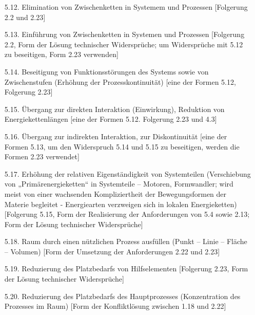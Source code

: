 \documentclass[11pt,a4paper]{article}
\begin{document}
\begin{itemize}
  \begin{itemize}
  \item zur Überwindung natürlicher Grenzen 
  \item zur Beseitigung ökologischer schädlicher Effekte
  \item zur Steigerung der Effizienz des Systems bei der Nutzung von Abfällen
    (insbesondere wenn die natürlichen Ressourcen erschöpft sind)
  \end{itemize}
[eine der Folgerungen 5.8 und 2.21, Folgerung 2.23. Form der Konfliktlösung
  zwischen 1.18 und 2.22, Form der Lösung technischer Widersprüche]
\item[5.12.] Elimination von Zwischenketten in Systemem und Prozessen
  [Folgerung 2.2 und 2.23]
\item[5.13.] Einführung von Zwischenketten in Systemen und Prozessen
  [Folgerung 2.2, Form der Lösung technischer Widersprüche; um Widersprüche
    mit 5.12 zu beseitigen, Form 2.23 verwenden]
\item[5.14.] Beseitigung von Funktionsstörungen des Systems sowie von
  Zwischenstufen (Erhöhung der Prozesskontinuität) [eine der Formen 5.12,
    Folgerung 2.23]
\item[5.15.] Übergang zur direkten Interaktion (Einwirkung), Reduktion von
  Energiekettenlängen [eine der Formen 5.12. Folgerung 2.23 und 4.3]
\item[5.16.] Übergang zur indirekten Interaktion, zur Diskontinuität [eine der
  Formen 5.13, um den Widerspruch 5.14 und 5.15 zu beseitigen, werden die
  Formen 2.23 verwendet]
\item[5.17.] Erhöhung der relativen Eigenständigkeit von Systemteilen
  (Verschiebung von „Primär\-energieketten“ in Systemteile -- Motoren,
  Formwandler; wird meist von einer wachsenden Kompliziertheit der
  Bewegungsformen der Materie begleitet - Energiearten verzweigen sich in
  lokalen Energieketten) [Folgerung 5.15, Form der Realisierung der
    Anforderungen von 5.4 sowie 2.13; Form der Lösung technischer
    Widersprüche]
\item[5.18.] Raum durch einen nützlichen Prozess ausfüllen (Punkt -- Linie --
  Fläche -- Volumen) [Form der Umsetzung der Anforderungen 2.22 und 2.23]
\item[5.19.] Reduzierung des Platzbedarfs von Hilfselementen [Folgerung 2.23,
  Form der Lösung technischer Widersprüche]
\item[5.20.] Reduzierung des Platzbedarfs des Hauptprozesses (Konzentration
  des Prozesses im Raum) [Form der Konfliktlösung zwischen 1.18 und 2.22]
\end{itemize}
\end{document}
